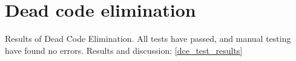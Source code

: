 \section{Dead code elimination}

Results of Dead Code Elimination.
All tests have passed, and manual testing have found no errors.
Results and discussion:
\ref{dce_test_results}

